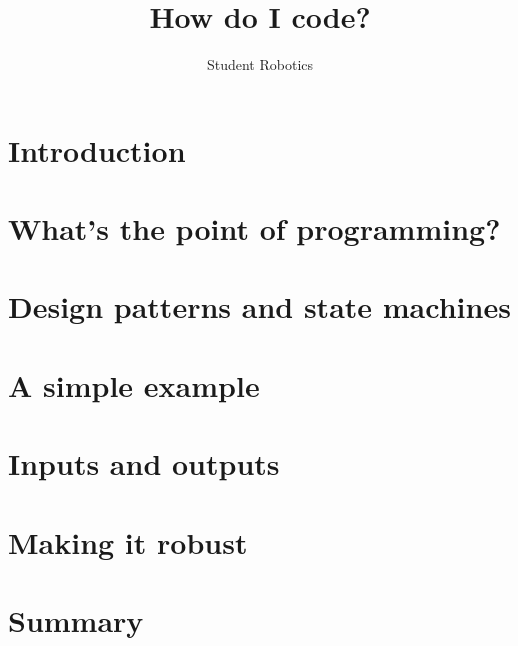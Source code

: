 \documentclass[a4paper,10pt]{article}
\title{How do I code?}
\author{Student Robotics}
\begin{document}
\maketitle

\section{Introduction}
\section{What's the point of programming?}
\section{Design patterns and state machines}
\section{A simple example}
\section{Inputs and outputs}
\section{Making it robust}
\section{Summary}
\end{document}
